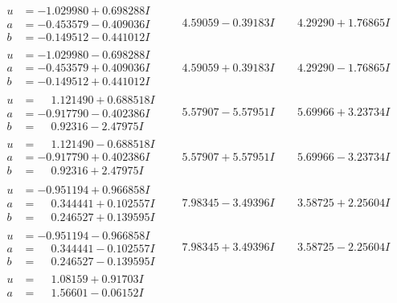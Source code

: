 \documentclass[1p]{elsarticle_modified}
\theoremstyle{definition}
\begin{document}
$$\begin{array}{c|c|c}
\begin{aligned}
u &= -1.029980 + 0.698288 I \\
a &= -0.453579 - 0.409036 I \\
b &= -0.149512 - 0.441012 I\end{aligned}
 & \phantom{-}4.59059 - 0.39183 I & \phantom{-}4.29290 + 1.76865 I \\ \hline\begin{aligned}
u &= -1.029980 - 0.698288 I \\
a &= -0.453579 + 0.409036 I \\
b &= -0.149512 + 0.441012 I\end{aligned}
 & \phantom{-}4.59059 + 0.39183 I & \phantom{-}4.29290 - 1.76865 I \\ \hline\begin{aligned}
u &= \phantom{-}1.121490 + 0.688518 I \\
a &= -0.917790 - 0.402386 I \\
b &= \phantom{-}0.92316 - 2.47975 I\end{aligned}
 & \phantom{-}5.57907 - 5.57951 I & \phantom{-}5.69966 + 3.23734 I \\ \hline\begin{aligned}
u &= \phantom{-}1.121490 - 0.688518 I \\
a &= -0.917790 + 0.402386 I \\
b &= \phantom{-}0.92316 + 2.47975 I\end{aligned}
 & \phantom{-}5.57907 + 5.57951 I & \phantom{-}5.69966 - 3.23734 I \\ \hline\begin{aligned}
u &= -0.951194 + 0.966858 I \\
a &= \phantom{-}0.344441 + 0.102557 I \\
b &= \phantom{-}0.246527 + 0.139595 I\end{aligned}
 & \phantom{-}7.98345 - 3.49396 I & \phantom{-}3.58725 + 2.25604 I \\ \hline\begin{aligned}
u &= -0.951194 - 0.966858 I \\
a &= \phantom{-}0.344441 - 0.102557 I \\
b &= \phantom{-}0.246527 - 0.139595 I\end{aligned}
 & \phantom{-}7.98345 + 3.49396 I & \phantom{-}3.58725 - 2.25604 I \\ \hline\begin{aligned}
u &= \phantom{-}1.08159 + 0.91703 I \\
a &= \phantom{-}1.56601 - 0.06152 I \\

\end{aligned}
\end{array}$$
\end{document}
